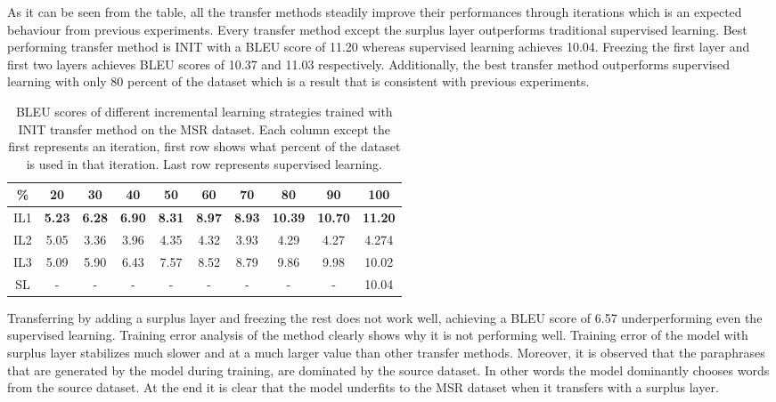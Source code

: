As it can be seen from the table, all the transfer methods steadily improve their performances through iterations which is an expected behaviour from previous experiments. Every transfer method except the surplus layer outperforms traditional supervised learning. Best performing transfer method is INIT with a BLEU score of 11.20 whereas supervised learning achieves 10.04. Freezing the first layer and first two layers achieves BLEU scores of 10.37 and 11.03 respectively. Additionally, the best transfer method outperforms supervised learning with only 80 percent of the dataset which is a result that is consistent with previous experiments.

\begin{table}[t]
\centering
\small
 \begin{tabular}{|c | c | c | c | c | c | c | c | c | c |} 
 \hline
 \% & 20 & 30 & 40 & 50 & 60 & 70 & 80 & 90 & 100 \\ [0.5ex] 
 \hline
  IL1 & \textbf{5.23} & \textbf{6.28} & \textbf{6.90} & \textbf{8.31} & \textbf{8.97} & \textbf{8.93} & \textbf{10.39} & \textbf{10.70} & \textbf{11.20}  \\ 
 \hline
  IL2 & 5.05 & 3.36 & 3.96 & 4.35 & 4.32 & 3.93 & 4.29 & 4.27 & 4.274 \\ 
 \hline
  IL3 & 5.09 & 5.90 & 6.43 & 7.57 & 8.52 & 8.79 & 9.86 & 9.98 & 10.02 \\ 
  \hline
  SL & - & - & - & - & - & - & - & - & 10.04 \\ 
 \hline
\end{tabular}
\caption{BLEU scores of different incremental learning strategies trained with INIT transfer method on the MSR dataset. Each column except the first represents an iteration, first row shows what percent of the dataset is used in that iteration. Last row represents supervised learning.}
\end{table}

Transferring by adding a surplus layer and freezing the rest does not work well, achieving a BLEU score of 6.57 underperforming even the supervised learning. Training error analysis of the method clearly shows why it is not performing well. Training error of the model with surplus layer stabilizes much slower and at a much larger value than other transfer methods. Moreover, it is observed that the paraphrases that are generated by the model during training, are dominated by the source dataset. In other words the model dominantly chooses words from the source dataset. At the end it is clear that the model underfits to the MSR dataset when it transfers with a surplus layer.

